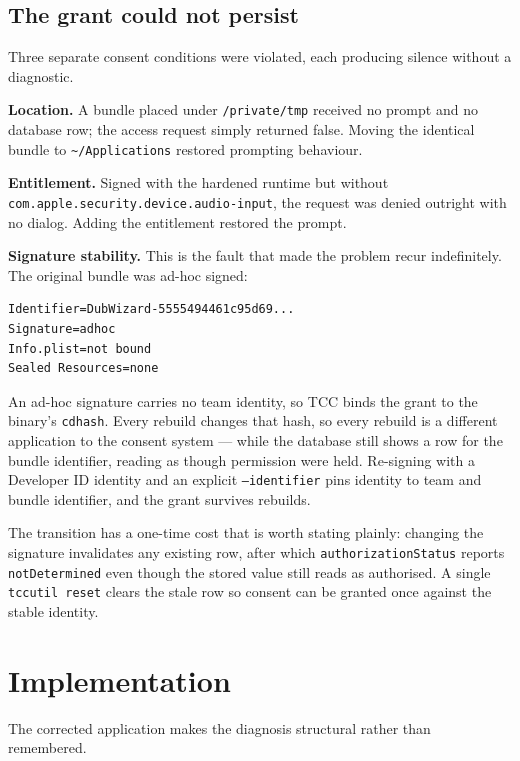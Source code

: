 \documentclass[10pt,letterpaper,twocolumn]{article}
\newcommand{\code}[1]{\texttt{#1}}
\begin{document}
\subsection{The grant could not persist}

Three separate consent conditions were violated, each producing silence without a diagnostic.

\textbf{Location.} A bundle placed under \code{/private/tmp} received no prompt and no database row; the access request simply returned false. Moving the identical bundle to \code{\textasciitilde/Applications} restored prompting behaviour.

\textbf{Entitlement.} Signed with the hardened runtime but without \code{com.apple.\allowbreak security.\allowbreak device.\allowbreak audio-input}, the request was denied outright with no dialog. Adding the entitlement restored the prompt.

\textbf{Signature stability.} This is the fault that made the problem recur indefinitely. The original bundle was ad-hoc signed:

\begin{lstlisting}
Identifier=DubWizard-5555494461c95d69...
Signature=adhoc
Info.plist=not bound
Sealed Resources=none
\end{lstlisting}

An ad-hoc signature carries no team identity, so TCC binds the grant to the binary's \code{cdhash}. Every rebuild changes that hash, so every rebuild is a different application to the consent system --- while the database still shows a row for the bundle identifier, reading as though permission were held. Re-signing with a Developer ID identity and an explicit \code{--identifier} pins identity to team and bundle identifier, and the grant survives rebuilds.

The transition has a one-time cost that is worth stating plainly: changing the signature invalidates any existing row, after which \code{authorizationStatus} reports \code{notDetermined} even though the stored value still reads as authorised. A single \code{tccutil reset} clears the stale row so consent can be granted once against the stable identity.

\section{Implementation}

The corrected application makes the diagnosis structural rather than remembered.
\end{document}
